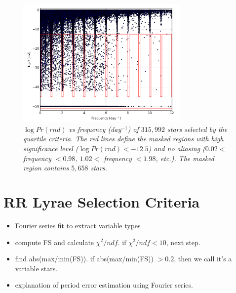 \documentclass[aps,prb,twocolumn,superscriptaddress]{revtex4-1}
\begin{document}
\begin{figure}[H]
 \centering
 	\includegraphics[width=3.3in]{figures/RlogPr.png}
 \caption{\it \small{$\log{Pr(rnd)}$ vs frequency (day$^{-1}$) of $315,992$ stars selected by the quartile criteria. The red lines define the masked regions with high significance level ($\log{Pr(rnd)} < -12.5$) and no aliasing ($0.02<$ frequency $<0.98$, $1.02<$ frequency $<1.98$, etc.). The masked region contains $5,658$ stars.}} 
 \label{fig:logPr}
\end{figure}




\section{RR Lyrae Selection Criteria}

\begin{itemize}
	\item{} Fourier series fit to extract variable types
\end{itemize}

\begin{itemize}
	\item{} compute FS and calculate $\chi^2 / ndf$. if $\chi^2 / ndf < 10$, next step.
	\item{} find abs(max/min(FS)). if abs(max/min(FS)) $> 0.2$, then we call it's a variable stars.
	\item{} explanation of period error estimation using Fourier series.
	\end{itemize}
\end{document}
